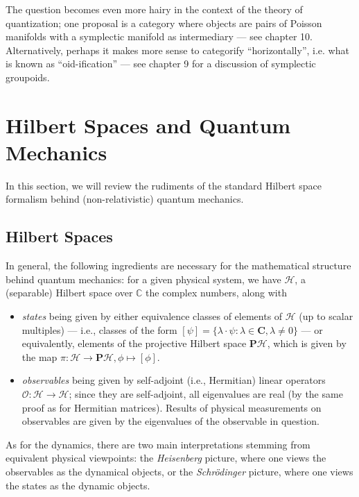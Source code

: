 The question becomes even more hairy in the context of the theory of quantization; one proposal is a category where objects are pairs of Poisson manifolds with a symplectic manifold as intermediary --- see chapter 10. Alternatively, perhaps it makes more sense to categorify ``horizontally'', i.e. what is known as ``oid-ification'' --- see chapter 9 for a discussion of symplectic groupoids.









\section{Hilbert Spaces and Quantum Mechanics}
In this section, we will review the rudiments of the standard Hilbert space formalism behind (non-relativistic) quantum mechanics.

\subsection{Hilbert Spaces}
In general, the following ingredients are necessary for the mathematical structure behind quantum mechanics: for a given physical system, we have $\mathcal{H}$, a (separable) Hilbert space over $\mathbb{C}$ the complex numbers, along with
\begin{itemize}
\item \emph{states} being given by either equivalence classes of elements of $\mathcal{H}$ (up to scalar multiples) --- i.e., classes of the form $[\psi] = \{\lambda \cdot \psi : \lambda \in \mathbf{C}, \lambda \neq 0 \}$ --- or equivalently, elements of the projective Hilbert space $\mathbf{P}\mathcal{H}$, which is given by the map $\pi: \mathcal{H} \to \mathbf{P}\mathcal{H}, \phi \mapsto [\phi]$.
\item \emph{observables} being given by self-adjoint (i.e., Hermitian) linear operators $\mathcal{O}: \mathcal{H} \to \mathcal{H}$; since they are self-adjoint, all eigenvalues are real (by the same proof as for Hermitian matrices). Results of physical measurements on observables are given by the eigenvalues of the observable in question.
\end{itemize}

As for the dynamics, there are two main interpretations stemming from equivalent physical viewpoints: the \emph{Heisenberg} picture, where one views the observables as the dynamical objects, or the \emph{Schr\"{o}dinger} picture, where one views the states as the dynamic objects.

